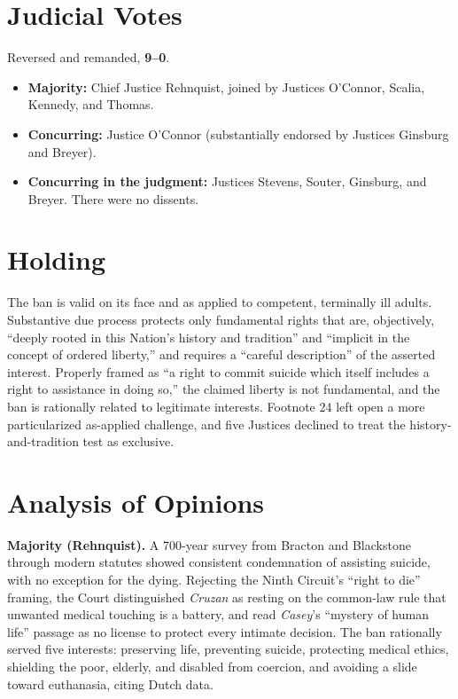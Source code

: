 \documentclass[12pt]{article}
\begin{document}
\section{Judicial Votes}

Reversed and remanded, \textbf{9--0}.
\begin{itemize}
\item \textbf{Majority:} Chief Justice Rehnquist, joined by Justices O'Connor, Scalia, Kennedy, and Thomas.
\item \textbf{Concurring:} Justice O'Connor (substantially endorsed by Justices Ginsburg and Breyer).
\item \textbf{Concurring in the judgment:} Justices Stevens, Souter, Ginsburg, and Breyer. There were no dissents.
\end{itemize}

\section{Holding}

The ban is valid on its face and as applied to competent, terminally ill adults. Substantive due process protects only fundamental rights that are, objectively, ``deeply rooted in this Nation's history and tradition'' and ``implicit in the concept of ordered liberty,'' and requires a ``careful description'' of the asserted interest. Properly framed as ``a right to commit suicide which itself includes a right to assistance in doing so,'' the claimed liberty is not fundamental, and the ban is rationally related to legitimate interests. Footnote 24 left open a more particularized as-applied challenge, and five Justices declined to treat the history-and-tradition test as exclusive.

\section{Analysis of Opinions}

\textbf{Majority (Rehnquist).} A 700-year survey from Bracton and Blackstone through modern statutes showed consistent condemnation of assisting suicide, with no exception for the dying. Rejecting the Ninth Circuit's ``right to die'' framing, the Court distinguished \textit{Cruzan} as resting on the common-law rule that unwanted medical touching is a battery, and read \textit{Casey}'s ``mystery of human life'' passage as no license to protect every intimate decision. The ban rationally served five interests: preserving life, preventing suicide, protecting medical ethics, shielding the poor, elderly, and disabled from coercion, and avoiding a slide toward euthanasia, citing Dutch data.
\end{document}

